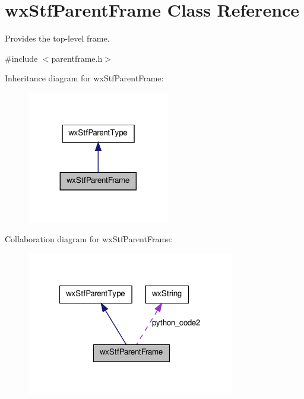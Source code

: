\hypertarget{classwxStfParentFrame}{
\section{wxStfParentFrame Class Reference}
\label{classwxStfParentFrame}
}


Provides the top-\/level frame.  




{\ttfamily \#include $<$parentframe.h$>$}



Inheritance diagram for wxStfParentFrame:
\nopagebreak
\begin{figure}[H]
\begin{center}
\leavevmode
\includegraphics[width=176pt]{classwxStfParentFrame__inherit__graph}
\end{center}
\end{figure}


Collaboration diagram for wxStfParentFrame:
\nopagebreak
\begin{figure}[H]
\begin{center}
\leavevmode
\includegraphics[width=257pt]{classwxStfParentFrame__coll__graph}
\end{center}
\end{figure}
